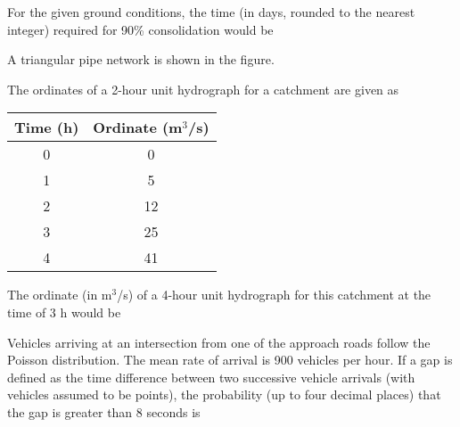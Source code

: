 For the given ground conditions, the time (in days, rounded to the nearest integer) required for 90\% consolidation would be \underline{\hspace{2cm}}

\item A triangular pipe network is shown in the figure.
\begin{figure}[!ht]
\centering
{}%

\label{fig:my_label}
\end{figure}



\item The ordinates of a 2-hour unit hydrograph for a catchment are given as

\begin{center}
\begin{tabular}{|c|c|}
\hline
Time (h) & Ordinate (m\(^3\)/s) \\
\hline
0 & 0 \\
1 & 5 \\
2 & 12 \\
3 & 25 \\
4 & 41 \\
\hline
\end{tabular}
\end{center}

The ordinate (in m\(^3\)/s) of a 4-hour unit hydrograph for this catchment at the time of 3 h would be \underline{\hspace{2cm}}



\item Vehicles arriving at an intersection from one of the approach roads follow the Poisson distribution. The mean rate of arrival is 900 vehicles per hour. If a gap is defined as the time difference between two successive vehicle arrivals (with vehicles assumed to be points), the probability (up to four decimal places) that the gap is greater than 8 seconds is \underline{\hspace{2cm}}

